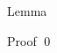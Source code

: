 \documentclass[a4paper]{article}
\begin{document}
\begin{parag}{Lemma}
\begin{subparag}{Proof }
        \qed
    \end{subparag}
\end{parag}
\end{document}
